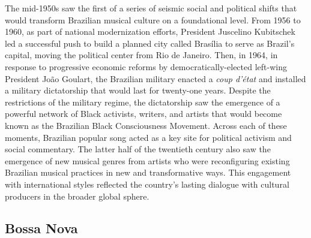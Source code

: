 \documentclass[twoside]{article}
\begin{document}
The mid-1950s saw the first of a series of seismic social and political
shifts that would transform Brazilian musical culture on a foundational
level. From 1956 to 1960, as part of national modernization efforts,
President Juscelino Kubitschek led a successful push to build a planned
city called Brasília to serve as Brazil's capital, moving the political
center from Rio de Janeiro. Then, in 1964, in response to progressive
economic reforms by democratically-elected left-wing President João
Goulart, the Brazilian military enacted a \emph{coup d'état} and
installed a military dictatorship that would last for twenty-one years.
Despite the restrictions of the military regime, the dictatorship saw
the emergence of a powerful network of Black activists, writers, and
artists that would become known as the Brazilian Black Consciousness
Movement. Across each of these moments, Brazilian popular song acted as
a key site for political activism and social commentary. The latter half
of the twentieth century also saw the emergence of new musical genres
from artists who were reconfiguring existing Brazilian musical practices
in new and transformative ways. This engagement with international
styles reflected the country's lasting dialogue with cultural producers
in the broader global sphere.

\hypertarget{bossa-nova}{%
\subsection*{Bossa Nova}\label{bossa-nova}}
\end{document}
